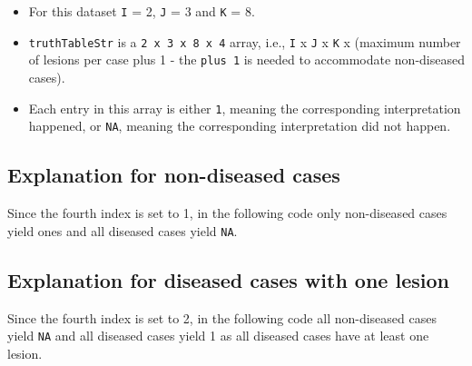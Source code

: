 \documentclass[
]{book}
\newenvironment{Shaded}{\begin{snugshade}}{\end{snugshade}}
\newcommand{\CommentTok}[1]{\textcolor[rgb]{0.56,0.35,0.01}{\textit{#1}}}
\newcommand{\DecValTok}[1]{\textcolor[rgb]{0.00,0.00,0.81}{#1}}
\newcommand{\KeywordTok}[1]{\textcolor[rgb]{0.13,0.29,0.53}{\textbf{#1}}}
\newcommand{\NormalTok}[1]{#1}
\newcommand{\OperatorTok}[1]{\textcolor[rgb]{0.81,0.36,0.00}{\textbf{#1}}}
\providecommand{\tightlist}{%
  \setlength{\itemsep}{0pt}\setlength{\parskip}{0pt}}
\begin{document}
\begin{itemize}
\tightlist
\item
  For this dataset \texttt{I} = 2, \texttt{J} = 3 and \texttt{K} = 8.
\item
  \texttt{truthTableStr} is a \texttt{2\ x\ 3\ x\ 8\ x\ 4} array, i.e., \texttt{I} x \texttt{J} x \texttt{K} x (maximum number of lesions per case plus 1 - the \texttt{plus\ 1} is needed to accommodate non-diseased cases).
\item
  Each entry in this array is either \texttt{1}, meaning the corresponding interpretation happened, or \texttt{NA}, meaning the corresponding interpretation did not happen.
\end{itemize}

\hypertarget{explanation-for-non-diseased-cases}{%
\subsection{Explanation for non-diseased cases}\label{explanation-for-non-diseased-cases}}

Since the fourth index is set to 1, in the following code only non-diseased cases yield ones and all diseased cases yield \texttt{NA}.

\begin{Shaded}
\end{Shaded}

\hypertarget{explanation-for-diseased-cases-with-one-lesion}{%
\subsection{Explanation for diseased cases with one lesion}\label{explanation-for-diseased-cases-with-one-lesion}}

Since the fourth index is set to 2, in the following code all non-diseased cases yield \texttt{NA} and all diseased cases yield 1 as all diseased cases have at least one lesion.
\end{document}
